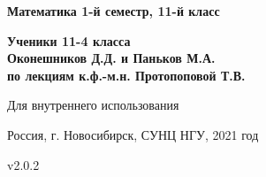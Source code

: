 \begin{titlepage}
    \begin{center}
        \vspace*{1cm}
            
        \Huge
        \textbf{Математика 1-й семестр, 11-й класс}
            
        \vspace{5cm}
        
        \Large
        \textbf{Ученики 11-4 класса}\\
        \textbf{Оконешников Д.Д. и Паньков М.А.}\\
        \textbf{по лекциям к.ф.-м.н. Протопоповой Т.В.}

        \vfill

        \vspace{0.8cm}

        \Large
        
        Для внутреннего использования
        
        Россия, г. Новосибирск, СУНЦ НГУ, 2021 год
        
        v2.0.2
            
    \end{center}
\end{titlepage}
\newpage

\tableofcontents
\thispagestyle{empty}
\setcounter{tocdepth}{5}
\newpage

